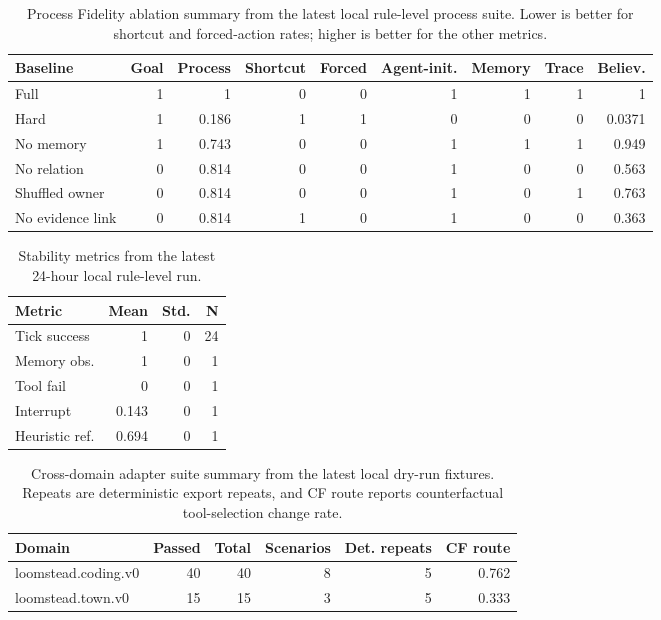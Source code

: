 
\begin{table}[t]
\centering
\small
\caption{Process Fidelity ablation summary from the latest local rule-level process suite. Lower is better for shortcut and forced-action rates; higher is better for the other metrics.}
\label{tab:process-ablation}
\begin{tabular}{lrrrrrrrr}
\toprule
Baseline & Goal & Process & Shortcut & Forced & Agent-init. & Memory & Trace & Believ. \\
\midrule
Full & 1 & 1 & 0 & 0 & 1 & 1 & 1 & 1 \\
Hard & 1 & 0.186 & 1 & 1 & 0 & 0 & 0 & 0.0371 \\
No memory & 1 & 0.743 & 0 & 0 & 1 & 1 & 1 & 0.949 \\
No relation & 0 & 0.814 & 0 & 0 & 1 & 0 & 0 & 0.563 \\
Shuffled owner & 0 & 0.814 & 0 & 0 & 1 & 0 & 1 & 0.763 \\
No evidence link & 0 & 0.814 & 1 & 0 & 1 & 0 & 0 & 0.363 \\
\bottomrule
\end{tabular}
\end{table}

\begin{table}[t]
\centering
\small
\caption{Stability metrics from the latest 24-hour local rule-level run.}
\label{tab:stability-24h}
\begin{tabular}{lrrr}
\toprule
Metric & Mean & Std. & N \\
\midrule
Tick success & 1 & 0 & 24 \\
Memory obs. & 1 & 0 & 1 \\
Tool fail & 0 & 0 & 1 \\
Interrupt & 0.143 & 0 & 1 \\
Heuristic ref. & 0.694 & 0 & 1 \\
\bottomrule
\end{tabular}
\end{table}

\begin{table}[t]
\centering
\small
\caption{Cross-domain adapter suite summary from the latest local dry-run fixtures. Repeats are deterministic export repeats, and CF route reports counterfactual tool-selection change rate.}
\label{tab:domain-adapter}
\begin{tabular}{lrrrrr}
\toprule
Domain & Passed & Total & Scenarios & Det. repeats & CF route \\
\midrule
loomstead.coding.v0 & 40 & 40 & 8 & 5 & 0.762 \\
loomstead.town.v0 & 15 & 15 & 3 & 5 & 0.333 \\
\bottomrule
\end{tabular}
\end{table}
